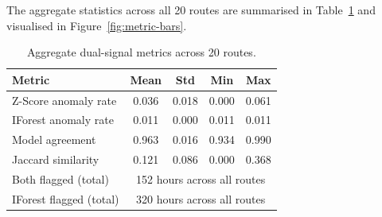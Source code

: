 The aggregate statistics across all 20 routes are summarised in
Table~\ref{tab:agg-metrics} and visualised in Figure~\ref{fig:metric-bars}.

\begin{table}[htbp]
\centering
\caption{Aggregate dual-signal metrics across 20 routes.}
\label{tab:agg-metrics}
\begin{tabular}{lcccc}
\hline
\textbf{Metric}      & \textbf{Mean} & \textbf{Std} & \textbf{Min} & \textbf{Max} \\
\hline
Z-Score anomaly rate  & 0.036 & 0.018 & 0.000 & 0.061 \\
IForest anomaly rate  & 0.011 & 0.000 & 0.011 & 0.011 \\
Model agreement       & 0.963 & 0.016 & 0.934 & 0.990 \\
Jaccard similarity    & 0.121 & 0.086 & 0.000 & 0.368 \\
\hline
Both flagged (total)  & \multicolumn{4}{c}{152 hours across all routes} \\
IForest flagged (total) & \multicolumn{4}{c}{320 hours across all routes} \\
\hline
\end{tabular}
\end{table}

